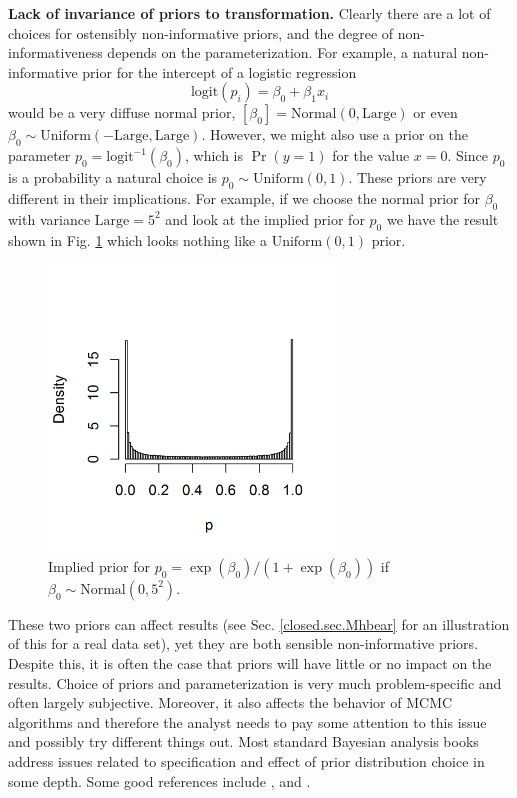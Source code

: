 {\bf Lack of invariance of priors to transformation.} Clearly there
are a lot of choices for ostensibly non-informative priors, and the
degree of non-informativeness depends on the parameterization. For
example, a natural non-informative prior for the intercept of a
logistic regression
\[
\mbox{logit}(p_{i}) = \beta_0 + \beta_1 x_{i}
\]
would be a very diffuse normal prior,
$[\beta_0] = \mbox{Normal}(0,\mbox{Large})$ or even
 $\beta_0 \sim
\mbox{Uniform}(-\mbox{Large},\mbox{Large})$.
However, we might also use a prior on the parameter $p_0
= \mbox{logit}^{-1}(\beta_0)$, which is $\Pr(y=1)$ for the value $x=0$. 
Since $p_0$ is a
probability a natural choice is $p_0 \sim \mbox{Uniform}(0,1)$. 
These priors are very different in their implications. For example, if
we choose the normal prior for $\beta_0$ with variance
$\mbox{Large} = 5^2$ and look at the implied prior for $p_{0}$
we have the result shown in Fig. \ref{glms.fig.impliedprior}
which looks nothing like a $\mbox{Uniform}(0,1)$ prior.
\begin{figure}[ht]
\begin{center}
\includegraphics[height=3.0in,width=3.0in]{Ch3-Bayes/figs/implied_prior}
\end{center}
\caption{Implied prior for $p_{0} = \exp(\beta_0)/(1+\exp(\beta_0))$ 
if $\beta_0 \sim \mbox{Normal}(0, 5^2)$.}
\label{glms.fig.impliedprior}
\end{figure}
These two priors can affect results (see Sec. \ref{closed.sec.Mhbear}
for an illustration of this for a real data set), yet they are both
sensible non-informative priors. Despite this, it is often the case
that priors will have little or no impact on the results.
Choice of priors and parameterization
is very much problem-specific and often largely subjective. Moreover,
it also affects the behavior of MCMC algorithms and therefore the
analyst needs to pay some attention to this issue and possibly try
different things out.  Most standard Bayesian analysis books address
issues related to specification and effect of prior distribution
choice in some depth. Some good references include
\citet{kass_wasserman:1996}, \citet{gelman:2006} and
\citet{link_barker:2010}.


